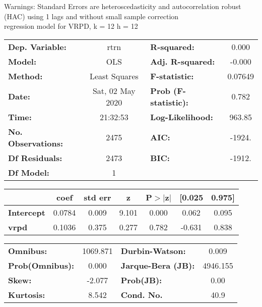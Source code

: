 Warnings: \newline
 [1] Standard Errors are heteroscedasticity and autocorrelation robust (HAC) using 1 lags and without small sample correction\\ 

regression model for VRPD, k = 12 h = 12\begin{center}
\begin{tabular}{lclc}
\toprule
\textbf{Dep. Variable:}    &       rtrn       & \textbf{  R-squared:         } &     0.000   \\
\textbf{Model:}            &       OLS        & \textbf{  Adj. R-squared:    } &    -0.000   \\
\textbf{Method:}           &  Least Squares   & \textbf{  F-statistic:       } &   0.07649   \\
\textbf{Date:}             & Sat, 02 May 2020 & \textbf{  Prob (F-statistic):} &    0.782    \\
\textbf{Time:}             &     21:32:53     & \textbf{  Log-Likelihood:    } &    963.85   \\
\textbf{No. Observations:} &        2475      & \textbf{  AIC:               } &    -1924.   \\
\textbf{Df Residuals:}     &        2473      & \textbf{  BIC:               } &    -1912.   \\
\textbf{Df Model:}         &           1      & \textbf{                     } &             \\
\bottomrule
\end{tabular}
\begin{tabular}{lcccccc}
                   & \textbf{coef} & \textbf{std err} & \textbf{z} & \textbf{P$> |$z$|$} & \textbf{[0.025} & \textbf{0.975]}  \\
\midrule
\textbf{Intercept} &       0.0784  &        0.009     &     9.101  &         0.000        &        0.062    &        0.095     \\
\textbf{vrpd}      &       0.1036  &        0.375     &     0.277  &         0.782        &       -0.631    &        0.838     \\
\bottomrule
\end{tabular}
\begin{tabular}{lclc}
\textbf{Omnibus:}       & 1069.871 & \textbf{  Durbin-Watson:     } &    0.009  \\
\textbf{Prob(Omnibus):} &   0.000  & \textbf{  Jarque-Bera (JB):  } & 4946.155  \\
\textbf{Skew:}          &  -2.077  & \textbf{  Prob(JB):          } &     0.00  \\
\textbf{Kurtosis:}      &   8.542  & \textbf{  Cond. No.          } &     40.9  \\
\bottomrule
\end{tabular}
\end{center}

